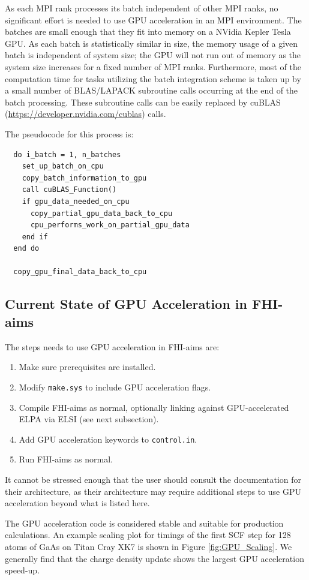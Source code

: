 As each MPI rank processes its batch independent of other MPI ranks, no significant effort is needed to use GPU acceleration in an MPI environment.  The batches are small enough that they fit into memory on a NVidia Kepler Tesla GPU.  As each batch is statistically similar in size, the memory usage of a given batch is independent of system size; the GPU will not run out of memory as the system size increases for a fixed number of MPI ranks.  Furthermore, most of the computation time for tasks utilizing the batch integration scheme is taken up by a small number of BLAS/LAPACK subroutine calls occurring at the end of the batch processing.  These subroutine calls can be easily replaced by cuBLAS (\url{https://developer.nvidia.com/cublas}) calls.

The pseudocode for this process is:
\begin{verbatim}
  do i_batch = 1, n_batches
    set_up_batch_on_cpu
    copy_batch_information_to_gpu
    call cuBLAS_Function()
    if gpu_data_needed_on_cpu
      copy_partial_gpu_data_back_to_cpu  
      cpu_performs_work_on_partial_gpu_data
    end if
  end do

  copy_gpu_final_data_back_to_cpu
\end{verbatim}

\subsection{Current State of GPU Acceleration in FHI-aims}

The steps needs to use GPU acceleration in FHI-aims are:
\begin{enumerate}
	\item Make sure prerequisites are installed.
	\item Modify \texttt{make.sys} to include GPU acceleration flags.
	\item Compile FHI-aims as normal, optionally linking against GPU-accelerated ELPA via ELSI (see next subsection).
	\item Add GPU acceleration keywords to \texttt{control.in}.
	\item Run FHI-aims as normal.
\end{enumerate}
It cannot be stressed enough that the user should consult the documentation for their architecture, as their architecture may require additional steps to use GPU acceleration beyond what is listed here.

The GPU acceleration code is considered stable and suitable for production calculations.  An example scaling plot for timings of the first SCF step for 128 atoms of GaAs on Titan Cray XK7 is shown in Figure \ref{fig:GPU_Scaling}.  We generally find that the charge density update shows the largest GPU acceleration speed-up.  


